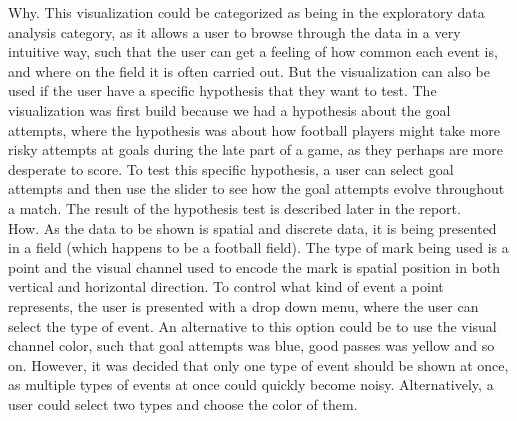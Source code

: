 \documentclass[Report.tex]{subfiles}
\begin{document}
\noindent Why. This visualization could be categorized as being in the exploratory data analysis category, as it allows a user to browse through the data in a very intuitive way, such that the user can get a feeling of how common each event is, and where on the field it is often carried out. But the visualization can also be used if the user have a specific hypothesis that they want to test. The visualization was first build because we had a hypothesis about the goal attempts, where the hypothesis was about how football players might take more risky attempts at goals during the late part of a game, as they perhaps are more desperate to score. To test this specific hypothesis, a user can select goal attempts and then use the slider to see how the goal attempts evolve throughout a match. The result of the hypothesis test is described later in the report.\\

\noindent How. As the data to be shown is spatial and discrete data, it is being presented in a field (which happens to be a football field). The type of mark being used is a point and the visual channel used to encode the mark is spatial position in both vertical and horizontal direction. To control what kind of event a point represents, the user is presented with a drop down menu, where the user can select the type of event. An alternative to this option could be to use the visual channel color, such that goal attempts was blue, good passes was yellow and so on. However, it was decided that only one type of event should be shown at once, as multiple types of events at once could quickly become noisy. Alternatively, a user could select two types and choose the color of them.
\end{document}
